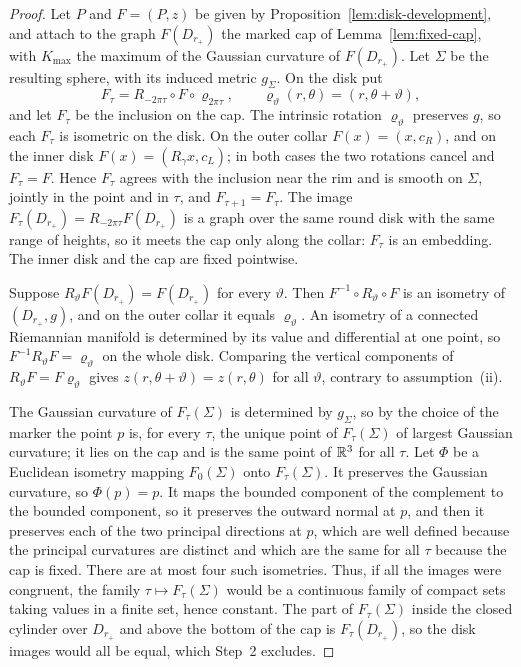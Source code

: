 \begin{proof}
Let $P$ and $F=(P,z)$ be given by
Proposition~\ref{lem:disk-development}, and attach to the graph
$F(D_{r_+})$ the marked cap of Lemma~\ref{lem:fixed-cap}, with
$K_{\max}$ the maximum of the Gaussian curvature of $F(D_{r_+})$. Let
$\Sigma$ be the resulting sphere, with its induced metric $g_\Sigma$.
On the disk put
\[
 F_\tau=R_{-2\pi\tau}\circ F\circ\varrho_{2\pi\tau},\qquad
 \varrho_\vartheta(r,\theta)=(r,\theta+\vartheta),
\]
and let $F_\tau$ be the inclusion on the cap. The intrinsic rotation
$\varrho_\vartheta$ preserves $g$, so each $F_\tau$ is isometric on
the disk. On the outer collar $F(x)=(x,c_R)$, and on the inner disk
$F(x)=(R_\gamma x,c_L)$; in both cases the two rotations cancel and
$F_\tau=F$. Hence $F_\tau$ agrees with the inclusion near the rim and
is smooth on $\Sigma$, jointly in the point and in $\tau$, and
$F_{\tau+1}=F_\tau$. The image $F_\tau(D_{r_+})=R_{-2\pi\tau}F(D_{r_+})$
is a graph over the same round disk with the same range of heights, so
it meets the cap only along the collar: $F_\tau$ is an embedding. The
inner disk and the cap are fixed pointwise.

Suppose $R_\vartheta F(D_{r_+})=F(D_{r_+})$ for every $\vartheta$. Then
$F^{-1}\circ R_\vartheta\circ F$ is an isometry of $(D_{r_+},g)$, and
on the outer collar it equals $\varrho_\vartheta$. An isometry of a
connected Riemannian manifold is determined by its value and
differential at one point, so $F^{-1}R_\vartheta F=\varrho_\vartheta$
on the whole disk. Comparing the vertical components of
$R_\vartheta F=F\varrho_\vartheta$ gives
$z(r,\theta+\vartheta)=z(r,\theta)$ for all $\vartheta$, contrary to
assumption~(ii).

The Gaussian curvature of $F_\tau(\Sigma)$ is determined by
$g_\Sigma$, so by the choice of the marker the point $p$ is, for every
$\tau$, the unique point of $F_\tau(\Sigma)$ of largest Gaussian
curvature; it lies on the cap and is the same point of $\mathbb R^3$ for all
$\tau$. Let $\Phi$ be a Euclidean isometry mapping $F_0(\Sigma)$ onto
$F_\tau(\Sigma)$. It preserves the Gaussian curvature, so
$\Phi(p)=p$. It maps the bounded component of the complement to the
bounded component, so it preserves the outward normal at $p$, and then
it preserves each of the two principal directions at $p$, which are
well defined because the principal curvatures are distinct and which
are the same for all $\tau$ because the cap is fixed. There are at
most four such isometries. Thus, if all the images were congruent, the
family $\tau\mapsto F_\tau(\Sigma)$ would be a continuous family of
compact sets taking values in a finite set, hence constant. The part
of $F_\tau(\Sigma)$ inside the closed cylinder over $D_{r_+}$ and above
the bottom of the cap is $F_\tau(D_{r_+})$, so the disk images would
all be equal, which Step~2 excludes.


\end{proof}
